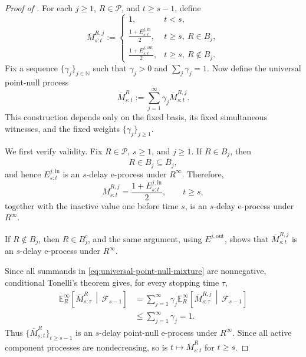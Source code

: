 \documentclass[12pt]{article}
\theoremstyle{spaced}
\theoremstyle{remark}
\newcommand{\N}{\mathbb N}
\newcommand{\calP}{\mathcal P}
\begin{document}
\begin{proof}[Proof of ]
For each $j\ge1$, $R\in\calP$, and $t\ge s-1$, define
\begin{equation}
\label{eq:component-point-null}
    \overline M_{s:t}^{R,j}
    :=
    \begin{cases}
    1,
        & t<s,\\[0.5em]
    \displaystyle
    \frac{1+E_{s:t}^{j,\mathrm{in}}}{2},
        & t\ge s,\ R\in B_j,\\[1.1em]
    \displaystyle
    \frac{1+E_{s:t}^{j,\mathrm{out}}}{2},
        & t\ge s,\ R\notin B_j.
    \end{cases}
\end{equation}
Fix a sequence $\{\gamma_j\}_{j\in\N}$ such that $\gamma_j> 0$ and $\sum_j\gamma_j=1$.
Now define the universal point-null process
\begin{equation}
\label{eq:universal-point-null-mixture}
    \overline M_{s:t}^{R}
    :=
    \sum_{j=1}^\infty
    \gamma_j\overline M_{s:t}^{R,j}.
\end{equation}
This construction depends only on the fixed basis, its fixed
simultaneous witnesses, and the fixed weights
$\{\gamma_j\}_{j\ge1}$.

We first verify validity. Fix $R\in\calP$, $s\ge1$, and
$j\ge1$. If $R\in B_j$, then
\[
    R\in B_j\subseteq\overline B_j,
\]
and hence $E_{s:t}^{j,\mathrm{in}}$ is an $s$-delay e-process
under $R^\infty$. Therefore,
\[
    \overline M_{s:t}^{R,j}
    =
    \frac{1+E_{s:t}^{j,\mathrm{in}}}{2},
    \qquad t\ge s,
\]
together with the inactive value one before time $s$, is an
$s$-delay e-process under $R^\infty$.

If $R\notin B_j$, then $R\in B_j^c$, and the same argument,
using $E^{j,\mathrm{out}}$, shows that
$\overline M^{R,j}_{s:t}$ is an $s$-delay e-process under
$R^\infty$.

Since all summands in \eqref{eq:universal-point-null-mixture}
are nonnegative, conditional Tonelli's theorem gives, for every
stopping time $\tau$,
\[
\begin{aligned}
    \mathbb E_R^\infty
    \left[
        \overline M_{s:\tau}^{R}
        \,\middle|\,
        \mathcal F_{s-1}
    \right]
    &=
    \sum_{j=1}^\infty
    \gamma_j
    \mathbb E_R^\infty
    \left[
        \overline M_{s:\tau}^{R,j}
        \,\middle|\,
        \mathcal F_{s-1}
    \right]  \\
    &\le
    \sum_{j=1}^\infty\gamma_j
    =1.
\end{aligned}
\]
Thus
$\{\overline M_{s:t}^{R}\}_{t\ge s-1}$ is an $s$-delay
point-null e-process under $R^\infty$. Since all active component
processes are nondecreasing, so is
$t\mapsto\overline M_{s:t}^{R}$ for $t\ge s$.


\end{proof}
\end{document}
